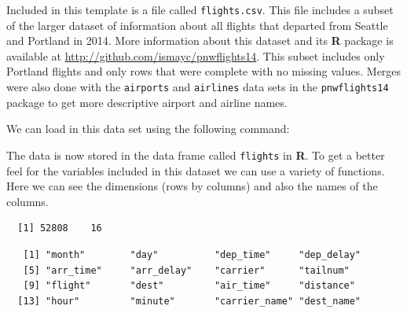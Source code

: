 \documentclass[12pt,twoside]{reedthesis}
\begin{document}
  Included in this template is a file called \texttt{flights.csv}. This
  file includes a subset of the larger dataset of information about all
  flights that departed from Seattle and Portland in 2014. More
  information about this dataset and its \textbf{R} package is available
  at \url{http://github.com/ismayc/pnwflights14}. This subset includes
  only Portland flights and only rows that were complete with no missing
  values. Merges were also done with the \texttt{airports} and
  \texttt{airlines} data sets in the \texttt{pnwflights14} package to get
  more descriptive airport and airline names.
  
  We can load in this data set using the following command:
  
  \begin{Shaded}
  \begin{Highlighting}[]
  \StringTok{ }\NormalTok{(}\NormalTok{)}
  \end{Highlighting}
  \end{Shaded}
  
  The data is now stored in the data frame called \texttt{flights} in
  \textbf{R}. To get a better feel for the variables included in this
  dataset we can use a variety of functions. Here we can see the
  dimensions (rows by columns) and also the names of the columns.
  
  \begin{Shaded}
  \begin{Highlighting}[]
  \end{Highlighting}
  \end{Shaded}
  
  \begin{verbatim}
  [1] 52808    16
  \end{verbatim}
  
  \begin{Shaded}
  \begin{Highlighting}[]
  \end{Highlighting}
  \end{Shaded}
  
  \begin{verbatim}
   [1] "month"        "day"          "dep_time"     "dep_delay"   
   [5] "arr_time"     "arr_delay"    "carrier"      "tailnum"     
   [9] "flight"       "dest"         "air_time"     "distance"    
  [13] "hour"         "minute"       "carrier_name" "dest_name"   
  \end{verbatim}
  
\end{document}
